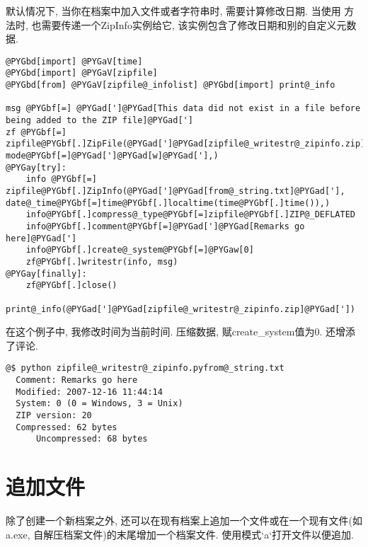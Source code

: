 \documentclass[a4paper,10pt,english]{manual}
\begin{document}
默认情况下, 当你在档案中加入文件或者字符串时, 需要计算修改日期. 当使用  方法时, 也需要传递一个ZipInfo实例给它, 该实例包含了修改日期和别的自定义元数据.

\begin{Verbatim}[commandchars=@\[\]]
@PYGbd[import] @PYGaV[time]
@PYGbd[import] @PYGaV[zipfile]
@PYGbd[from] @PYGaV[zipfile@_infolist] @PYGbd[import] print@_info

msg @PYGbf[=] @PYGad[']@PYGad[This data did not exist in a file before being added to the ZIP file]@PYGad[']
zf @PYGbf[=] zipfile@PYGbf[.]ZipFile(@PYGad[']@PYGad[zipfile@_writestr@_zipinfo.zip]@PYGad['], mode@PYGbf[=]@PYGad[']@PYGad[w]@PYGad['],)
@PYGay[try]:
    info @PYGbf[=] zipfile@PYGbf[.]ZipInfo(@PYGad[']@PYGad[from@_string.txt]@PYGad['], date@_time@PYGbf[=]time@PYGbf[.]localtime(time@PYGbf[.]time()),)
    info@PYGbf[.]compress@_type@PYGbf[=]zipfile@PYGbf[.]ZIP@_DEFLATED
    info@PYGbf[.]comment@PYGbf[=]@PYGad[']@PYGad[Remarks go here]@PYGad[']
    info@PYGbf[.]create@_system@PYGbf[=]@PYGaw[0]
    zf@PYGbf[.]writestr(info, msg)
@PYGay[finally]:
    zf@PYGbf[.]close()

print@_info(@PYGad[']@PYGad[zipfile@_writestr@_zipinfo.zip]@PYGad['])
\end{Verbatim}

在这个例子中, 我修改时间为当前时间. 压缩数据, 赋create\_system值为0. 还增添了评论.

\begin{Verbatim}[commandchars=@\[\]]
@$ python zipfile@_writestr@_zipinfo.pyfrom@_string.txt
  Comment: Remarks go here
  Modified: 2007-12-16 11:44:14
  System: 0 (0 = Windows, 3 = Unix)
  ZIP version: 20
  Compressed: 62 bytes
      Uncompressed: 68 bytes
\end{Verbatim}


\section{追加文件}

除了创建一个新档案之外, 还可以在现有档案上追加一个文件或在一个现有文件(如a.exe, 自解压档案文件)的末尾增加一个档案文件. 使用模式‘a‘打开文件以便追加.
\end{document}
